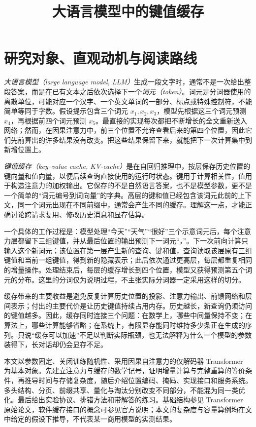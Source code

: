 \documentclass[UTF8,12pt,a4paper,fontset=fandol]{ctexart}
\title{大语言模型中的键值缓存}
\author{}
\date{}
\begin{document}
\maketitle
\tableofcontents

\section{研究对象、直观动机与阅读路线}
\label{sec:kv-introduction}

\emph{大语言模型（large language model, LLM）}生成一段文字时，通常不是一次给出整段答案，而是在已有文本之后依次选择下一个\emph{词元（token）}。词元是分词器使用的离散单位，可能对应一个汉字、一个英文单词的一部分、标点或特殊控制符，不能简单等同于字数。假设提示包含三个词元 $x_1,x_2,x_3$，模型先根据这三个词元预测 $x_4$，再根据前四个词元预测 $x_5$。最直接的实现每次都把不断增长的全文重新送入网络；然而，在因果注意力中，前三个位置不允许查看后来的第四个位置，因此它们先前算出的许多结果没有改变。把这些结果保留下来，就能把下一次计算集中到新增位置上。

\emph{键值缓存（key--value cache, KV-cache）}是在自回归推理中，按层保存历史位置的键向量和值向量，以便后续查询直接使用的运行时状态。键用于计算相关性，值用于构造注意力的加权输出。它保存的不是自然语言答案，也不是模型参数，更不是一个简单的“词元编号到词向量”的字典。高层的键和值已经包含该词元此前的上下文，同一个词元出现在不同前缀中，通常会产生不同的缓存。理解这一点，才能正确讨论跨请求复用、修改历史消息和显存估算。

一个具体的工作过程是：模型处理“今天”“天气”“很好”三个示意词元后，每个注意力层都留下三组键值，并从最后位置的输出预测下一词元“，”。下一次前向计算只输入这个新词元；该位置在第一层产生新的查询、键和值，查询读取该层原有三组键值和当前一组键值，得到新的隐藏表示；此后依次通过更高层，每层都重复相同的增量操作。处理结束后，每层的缓存增长到四个位置，模型又获得预测第五个词元的分布。这里的分词仅为说明过程，不主张实际分词器一定采用这样的切分。

缓存带来的主要收益是避免反复计算历史位置的投影、注意力输出、前馈网络和层间表示；付出的主要代价是让历史键值持续占用内存。历史越长，新查询仍须访问的键值越多。因此，缓存同时连接三个问题：在数学上，哪些中间量保持不变；在算法上，哪些计算能够省略；在系统上，有限显存能同时维持多少条正在生成的序列。只说“缓存可以加速”不足以判断实际瓶颈，也无法解释为什么一个模型的参数装得下，长对话却仍会显存不足。

本文以参数固定、关闭训练随机性、采用因果自注意力的仅解码器 Transformer 为基本对象。先建立注意力与缓存的数学记号，证明增量计算与完整重算的等价条件，再推导时间与存储复杂度，随后介绍位置编码、掩码、实现接口和服务系统。多头结构、分页、前缀共享、量化与淘汰分别改变不同部分，不能混为同一类优化。最后给出实验协议、排错方法和带解答的练习。基础结构参见 Transformer 原始论文\cite{transformer}，软件缓存接口的概念可参见官方说明\cite{hf-cache}；本文的复杂度与容量算例均在文中给定的假设下推导，不代表某一商用模型的实测结果。
\end{document}
